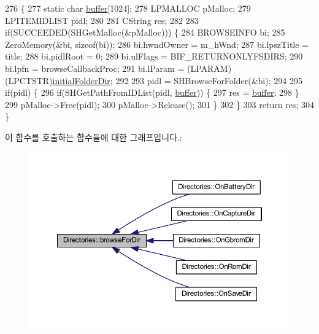 \begin{DoxyCode}
276 \{
277   \textcolor{keyword}{static} \textcolor{keywordtype}{char} \mbox{\hyperlink{_g_b_a_8cpp_a28d4d3d8445e73a696b2d6f7eadabd96}{buffer}}[1024];
278   LPMALLOC pMalloc;
279   LPITEMIDLIST pidl;
280   
281   CString res;
282   
283   \textcolor{keywordflow}{if}(SUCCEEDED(SHGetMalloc(&pMalloc))) \{
284     BROWSEINFO bi;
285     ZeroMemory(&bi, \textcolor{keyword}{sizeof}(bi));
286     bi.hwndOwner = m\_hWnd;
287     bi.lpszTitle = title;
288     bi.pidlRoot = 0;
289     bi.ulFlags = BIF\_RETURNONLYFSDIRS;
290     bi.lpfn = browseCallbackProc;
291     bi.lParam = (LPARAM)(LPCTSTR)\mbox{\hyperlink{class_directories_a5f307fd959af44c194c520b5452cafba}{initialFolderDir}};
292     
293     pidl = SHBrowseForFolder(&bi);
294     
295     \textcolor{keywordflow}{if}(pidl) \{
296       \textcolor{keywordflow}{if}(SHGetPathFromIDList(pidl, \mbox{\hyperlink{_g_b_a_8cpp_a28d4d3d8445e73a696b2d6f7eadabd96}{buffer}})) \{
297         res = \mbox{\hyperlink{_g_b_a_8cpp_a28d4d3d8445e73a696b2d6f7eadabd96}{buffer}};
298       \}
299       pMalloc->Free(pidl);
300       pMalloc->Release();
301     \}
302   \}
303   \textcolor{keywordflow}{return} res;
304 \}
\end{DoxyCode}
이 함수를 호출하는 함수들에 대한 그래프입니다.\+:
\nopagebreak
\begin{figure}[H]
\begin{center}
\leavevmode
\includegraphics[width=350pt]{class_directories_a7e24bf265fe6af9c01e0939952c337e1_icgraph}
\end{center}
\end{figure}
\mbox{\label{class_directories_a1c9309bbbbd233e7d5916f868f1f2671}} 
